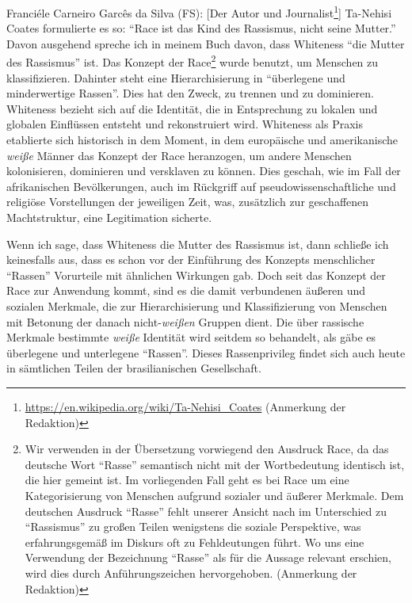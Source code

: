 \documentclass[a4paper,
fontsize=11pt,
oneside,
numbers=noperiodatend,
parskip=half-,
bibliography=totoc,
final
]{scrartcl}
\begin{document}
Franciéle Carneiro Garcês da Silva (FS): {[}Der Autor und
Journalist\footnote{\url{https://en.wikipedia.org/wiki/Ta-Nehisi_Coates}
  (Anmerkung der Redaktion)}{]} Ta-Nehisi Coates formulierte es so:
\enquote{Race ist das Kind des Rassismus, nicht seine Mutter.} Davon
ausgehend spreche ich in meinem Buch davon, dass Whiteness \enquote{die
Mutter des Rassismus} ist. Das Konzept der Race\footnote{Wir verwenden
  in der Übersetzung vorwiegend den Ausdruck Race, da das deutsche Wort
  \enquote{Rasse} semantisch nicht mit der Wortbedeutung identisch ist,
  die hier gemeint ist. Im vorliegenden Fall geht es bei Race um eine
  Kategorisierung von Menschen aufgrund sozialer und äußerer Merkmale.
  Dem deutschen Ausdruck \enquote{Rasse} fehlt unserer Ansicht nach im
  Unterschied zu \enquote{Rassismus} zu großen Teilen wenigstens die
  soziale Perspektive, was erfahrungsgemäß im Diskurs oft zu
  Fehldeutungen führt. Wo uns eine Verwendung der Bezeichnung
  \enquote{Rasse} als für die Aussage relevant erschien, wird dies durch
  Anführungszeichen hervorgehoben. (Anmerkung der Redaktion)} wurde
benutzt, um Menschen zu klassifizieren. Dahinter steht eine
Hierarchisierung in \enquote{überlegene und minderwertige Rassen}. Dies
hat den Zweck, zu trennen und zu dominieren. Whiteness bezieht sich auf
die Identität, die in Entsprechung zu lokalen und globalen Einflüssen
entsteht und rekonstruiert wird. Whiteness als Praxis etablierte sich
historisch in dem Moment, in dem europäische und amerikanische
\emph{weiße} Männer das Konzept der Race heranzogen, um andere Menschen
kolonisieren, dominieren und versklaven zu können. Dies geschah, wie im
Fall der afrikanischen Bevölkerungen, auch im Rückgriff auf
pseudowissenschaftliche und religiöse Vorstellungen der jeweiligen Zeit,
was, zusätzlich zur geschaffenen Machtstruktur, eine Legitimation
sicherte.

Wenn ich sage, dass Whiteness die Mutter des Rassismus ist, dann
schließe ich keinesfalls aus, dass es schon vor der Einführung des
Konzepts menschlicher \enquote{Rassen} Vorurteile mit ähnlichen
Wirkungen gab. Doch seit das Konzept der Race zur Anwendung kommt, sind
es die damit verbundenen äußeren und sozialen Merkmale, die zur
Hierarchisierung und Klassifizierung von Menschen mit Betonung der
danach nicht-\emph{weißen} Gruppen dient. Die über rassische Merkmale
bestimmte \emph{weiße} Identität wird seitdem so behandelt, als gäbe es
überlegene und unterlegene \enquote{Rassen}. Dieses Rassenprivileg
findet sich auch heute in sämtlichen Teilen der brasilianischen
Gesellschaft.
\end{document}
